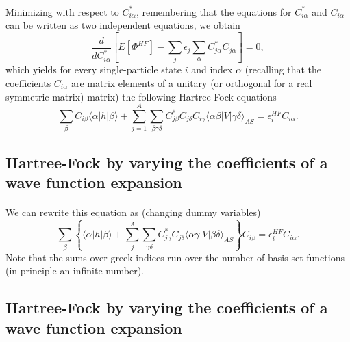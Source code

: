 \documentclass[%
twoside,                 %
final,                   %
10pt]{article}
\begin{document}
\paragraph{}
Minimizing with respect to $C^*_{i\alpha}$, remembering that the equations for $C^*_{i\alpha}$ and $C_{i\alpha}$
can be written as two  independent equations, we obtain
\[
\frac{d}{dC^*_{i\alpha}}\left[  E[\Phi^{HF}] - \sum_{j}\epsilon_j\sum_{\alpha} C^*_{j\alpha}C_{j\alpha}\right]=0,
\]
which yields for every single-particle state $i$ and index $\alpha$ (recalling that the coefficients $C_{i\alpha}$ are matrix elements of a unitary (or orthogonal for a real symmetric matrix) matrix)
the following Hartree-Fock equations
\[
\sum_{\beta} C_{i\beta}\langle \alpha | h | \beta \rangle+
\sum_{j=1}^A\sum_{\beta\gamma\delta} C^*_{j\beta}C_{j\delta}C_{i\gamma}\langle \alpha\beta|V|\gamma\delta\rangle_{AS}=\epsilon_i^{HF}C_{i\alpha}.
\]



\subsection*{Hartree-Fock by varying the coefficients of a wave function expansion}

\paragraph{}
We can rewrite this equation as (changing dummy variables)
\[
\sum_{\beta} \left\{\langle \alpha | h | \beta \rangle+
\sum_{j}^A\sum_{\gamma\delta} C^*_{j\gamma}C_{j\delta}\langle \alpha\gamma|V|\beta\delta\rangle_{AS}\right\}C_{i\beta}=\epsilon_i^{HF}C_{i\alpha}.
\]
Note that the sums over greek indices run over the number of basis set functions (in principle an infinite number).



\subsection*{Hartree-Fock by varying the coefficients of a wave function expansion}

\end{document}
